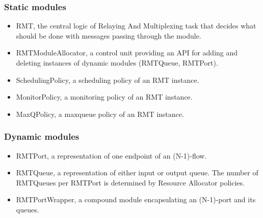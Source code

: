             \subsubsection{Static modules}
            \begin{itemize}
                \item RMT, the central logic of Relaying And Multiplexing task that decides what should be done with messages passing through the module.
                \item RMTModuleAllocator, a control unit providing an API for adding and deleting instances of dynamic modules (RMTQueue, RMTPort).
                \item SchedulingPolicy, a scheduling policy of an RMT instance.
                \item MonitorPolicy, a monitoring policy of an RMT instance.
                \item MaxQPolicy, a maxqueue policy of an RMT instance.
            \end{itemize}

            \subsubsection{Dynamic modules}
            \begin{itemize}
                \item RMTPort, a representation of one endpoint of an (N-1)-flow.
                \item RMTQueue, a representation of either input or output queue. The number of RMTQueues per RMTPort is determined by Resource Allocator policies.
                \item RMTPortWrapper, a compound module encapsulating an (N-1)-port and its queues.
            \end{itemize}

